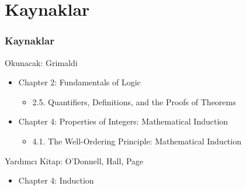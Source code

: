 \documentclass[dvipsnames]{beamer}
\theoremstyle{definition}
\theoremstyle{example}
\theoremstyle{plain}
\begin{document}
\section*{Kaynaklar}

\begin{frame}
  \frametitle{Kaynaklar}

  \begin{block}{Okunacak: Grimaldi}
    \begin{itemize}
      \item Chapter 2: Fundamentals of Logic
      \begin{itemize}
        \item 2.5. \alert{Quantifiers, Definitions, and the Proofs of Theorems}
      \end{itemize}

      \item Chapter 4: Properties of Integers: Mathematical Induction
      \begin{itemize}
        \item 4.1. \alert{The Well-Ordering Principle: Mathematical Induction}
      \end{itemize}
    \end{itemize}

  \begin{block}{Yardımcı Kitap: O'Donnell, Hall, Page}
    \begin{itemize}
      \item Chapter 4: Induction
    \end{itemize}
  \end{block}
  \end{block}
\end{frame}
\end{document}
